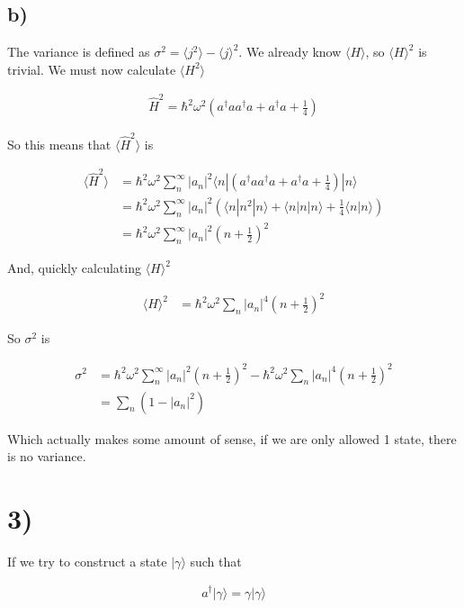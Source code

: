 \documentclass{article}
\newcommand{\p}[1]{\left(#1\right)}
\newcommand{\braket}[1]{\langle#1\rangle}
\newcommand{\bra}[1]{|#1\rangle}
\begin{document}
\subsection*{b)}

The variance is defined as $\sigma^2=\braket{j^2}-\braket{j}^2$. We already know $\braket{H}$, so $\braket{H}^2$ is trivial. We must now calculate $\braket{H^2}$

\begin{align*}
    \hat{H}^2=\hbar^2\omega^2\p{a^\dagger{a}a^\dagger{a}+a^\dagger{a}+\frac{1}{4}}
\end{align*}

So this means that $\braket{\hat{H}^2}$ is

\begin{align*}
    \braket{\hat{H}^2}&=\hbar^2\omega^2\sum_{n}^{\infty}|a_n|^2\braket{n|\p{a^\dagger{a}a^\dagger{a}+a^\dagger{a}+\frac{1}{4}}|n}\\[1em]
    &=\hbar^2\omega^2\sum_{n}^{\infty}|a_n|^2\p{\braket{n|n^2|n}+\braket{n|n|n}+\frac{1}{4}\braket{n|n}}\\[1em]
    &=\hbar^2\omega^2\sum_{n}^{\infty}|a_n|^2\p{n+\frac{1}{2}}^2
\end{align*}

And, quickly calculating $\braket{H}^2$

\begin{align*}
    \braket{H}^2&=\hbar^2\omega^2\sum_n|a_n|^4\p{n+\frac{1}{2}}^2
\end{align*}

So $\sigma^2$ is

\begin{align*}
    \sigma^2&=\hbar^2\omega^2\sum_{n}^{\infty}|a_n|^2\p{n+\frac{1}{2}}^2-\hbar^2\omega^2\sum_n|a_n|^4\p{n+\frac{1}{2}}^2\\[1em]
    &=\sum_n\p{1-|a_n|^2}
\end{align*}

Which actually makes some amount of sense, if we are only allowed 1 state, there is no variance.

\section*{3)}

If we try to construct a state $\bra{\gamma}$ such that

\begin{align*}
    a^\dagger\bra{\gamma}=\gamma\bra{\gamma}
\end{align*}
\end{document}
